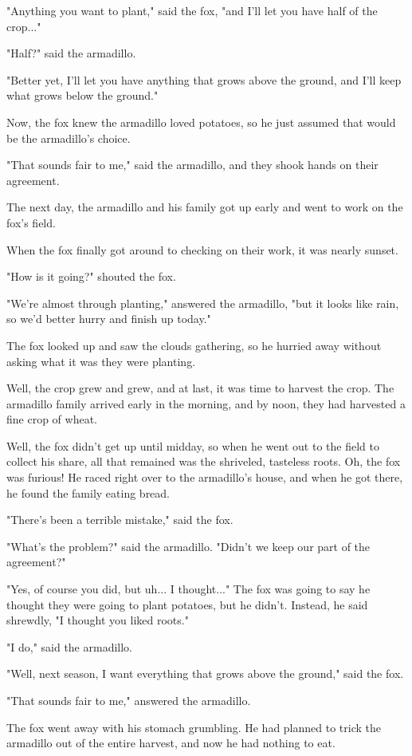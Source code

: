 "Anything you want to plant," said the fox, "and I'll let you have half of the crop..."

"Half?" said the armadillo.

"Better yet, I'll let you have anything that grows above the ground, and I'll keep what grows below the ground."

Now, the fox knew the armadillo loved potatoes, so he just assumed that would be the armadillo's choice.

"That sounds fair to me," said the armadillo, and they shook hands on their agreement.

The next day, the armadillo and his family got up early and went to work on the fox's field.

When the fox finally got around to checking on their work, it was nearly sunset.

"How is it going?" shouted the fox.

"We're almost through planting," answered the armadillo, "but it looks like rain, so we'd better hurry and finish up today."

The fox looked up and saw the clouds gathering, so he hurried away without asking what it was they were planting.

Well, the crop grew and grew, and at last, it was time to harvest the crop. The armadillo family arrived early in the morning, and by noon, they had harvested a fine crop of wheat.

Well, the fox didn't get up until midday, so when he went out to the field to collect his share, all that remained was the shriveled, tasteless roots. Oh, the fox was furious! He raced right over to the armadillo's house, and when he got there, he found the family eating bread.

"There's been a terrible mistake," said the fox.

"What's the problem?" said the armadillo. "Didn't we keep our part of the agreement?"

"Yes, of course you did, but uh... I thought..." The fox was going to say he thought they were going to plant potatoes, but he didn't. Instead, he said shrewdly, "I thought you liked roots."

"I do," said the armadillo.

"Well, next season, I want everything that grows above the ground," said the fox.

"That sounds fair to me," answered the armadillo.

The fox went away with his stomach grumbling. He had planned to trick the armadillo out of the entire harvest, and now he had nothing to eat.

